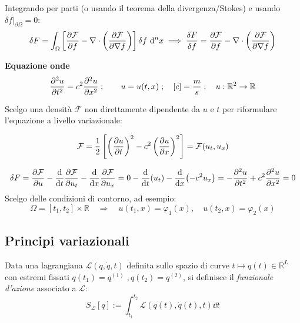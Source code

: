 Integrando per parti (o usando il teorema della divergenza/Stokes) e usando \(\delta f|_{\partial \Omega} = 0\):
\begin{equation}
    \delta F = \int_{\Omega} \left[ \pdv{\mathcal{F}}{f} - \nabla \cdot \left( \pdv{\mathcal{F}}{\nabla f} \right) \right] \delta f \, \dd[n]{x}
    \implies
    \frac{\delta F}{\delta f}=\pdv{\mathcal{F}}{f} - \nabla \cdot \left( \pdv{\mathcal{F}}{\nabla f} \right)
\end{equation}


\begin{example}
    \textbf{Equazione onde}\\

    \begin{equation}
        \pdv[2]{u}{t} = c^2 \pdv[2]{u}{x} \;;\qquad u = u(t,x) \;;\quad [c] = \frac{m}{s}
        \;;\quad u : \mathbb{R}^2 \to \mathbb{R}
    \end{equation}

    Scelgo una densità $\mathcal{F}$ non direttamente dipendente da $u$ e $t$ per riformulare l'equazione a livello variazionale:

    \begin{equation}
        \mathcal{F} = \frac{1}{2} \left[ \left( \pdv{u}{t} \right)^2 - c^2 \left( \pdv{u}{x} \right)^2 \right]
        = \mathcal{F}(u_t, u_x)
    \end{equation}

    \begin{equation}
        \delta F = \pdv{\mathcal{F}}{u} - \dv{t} \pdv{\mathcal{F}}{u_t} - \dv{x} \pdv{\mathcal{F}}{u_x}
        = 0 - \dv{t}(u_t) - \dv{x}(-c^2 u_x)
        = -\pdv[2]{u}{t} + c^2 \pdv[2]{u}{x} = 0
    \end{equation}
    Scelgo delle condizioni di contorno, ad esempio:
    \begin{equation}
        \Omega = [t_1, t_2] \times \mathbb{R} \quad \Rightarrow \quad u(t_1, x) = \varphi_1(x), \quad u(t_2, x) = \varphi_2(x)
    \end{equation}
\end{example}

\subsection{Principi variazionali}

\begin{definition}
    Data una lagrangiana $\mathcal{L}(q,\dot{q},t)$ definita sullo spazio di curve $t\mapsto q(t)\in \mathbb{R}^L$ 
    con estremi fissati $q(t_1)=q^{(1)}\;,q(t_2)=q^{(2)}$, si definisce il \textit{funzionale d'azione} associato a $\mathcal{L}$:
    \begin{equation}
        S_\mathcal{L}[q]:=\int_{t_1}^{t_2}\mathcal{L}(q(t),\dot{q}(t),t)\dd{t}
    \end{equation}    
\end{definition}


